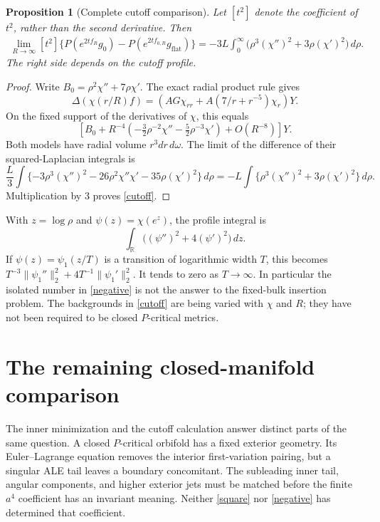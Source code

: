 \documentclass[11pt]{article}
\newcommand{\dd}{\,d}
\newtheorem{proposition}{Proposition}
\begin{document}
\begin{proposition}[Complete cutoff comparison]
Let $[t^2]$ denote the coefficient of $t^2$, rather than the second
derivative. Then
\begin{align}
 \lim_{R\to\infty}[t^2]\{P(e^{2tf_R}g_0)
  -P(e^{2tf_{0,R}}g_{\mathrm{flat}})\}
  =-3L\int_0^\infty
      \bigl(\rho^3(\chi'')^2+3\rho(\chi')^2\bigr)\dd\rho.
 \label{cutoff}
\end{align}
The right side depends on the cutoff profile.
\end{proposition}
\begin{proof}
Write $B_0=\rho^2\chi''+7\rho\chi'$. The exact radial product rule gives
\[
 \Delta(\chi(r/R)f)
 =\left(AG\chi_{rr}+A(7/r+r^{-5})\chi_r\right)Y.
\]
On the fixed support of the derivatives of $\chi$, this equals
\[
 \left[B_0+R^{-4}\left(-\tfrac32\rho^{-2}\chi''
                         -\tfrac52\rho^{-3}\chi'\right)
       +O(R^{-8})\right]Y.
\]
Both models have radial volume $r^3dr\,d\omega$.
The limit of the difference of their squared-Laplacian integrals is
\[
 \frac L3\int\{-3\rho^3(\chi'')^2
             -26\rho^2\chi''\chi'-35\rho(\chi')^2\}\dd\rho
 =-L\int\{\rho^3(\chi'')^2+3\rho(\chi')^2\}\dd\rho.
\]
Multiplication by $3$ proves \eqref{cutoff}.
\end{proof}
With $z=\log\rho$ and $\psi(z)=\chi(e^z)$, the profile integral is
\[
 \int_{\mathbb R}\bigl((\psi'')^2+4(\psi')^2\bigr)\dd z.
\]
If $\psi(z)=\psi_1(z/T)$ is a transition of logarithmic width $T$,
this becomes $T^{-3}\|\psi_1''\|_2^2+4T^{-1}\|\psi_1'\|_2^2$.
It tends to zero as $T\to\infty$. In particular the isolated number in
\eqref{negative} is not the answer to the fixed-bulk insertion problem.
The backgrounds in \eqref{cutoff} are being varied with $\chi$ and $R$;
they have not been required to be closed $P$-critical metrics.

\section{The remaining closed-manifold comparison}
The inner minimization and the cutoff calculation answer distinct parts
of the same question. A closed $P$-critical orbifold has a fixed exterior
geometry. Its Euler--Lagrange equation removes the interior first-variation
pairing, but a singular ALE tail leaves a boundary concomitant. The
subleading inner tail, angular components, and higher exterior jets must
be matched before the finite $a^4$ coefficient has an invariant meaning.
Neither \eqref{square} nor \eqref{negative} has determined that coefficient.
\end{document}
